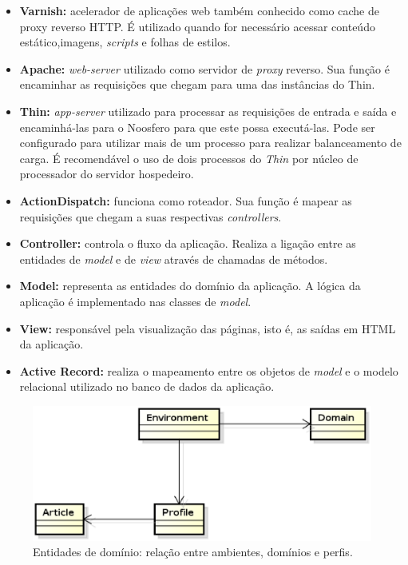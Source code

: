 \begin{itemize}
	\item \textbf{Varnish:} acelerador de aplicações web também conhecido 
	como cache de proxy reverso HTTP. É utilizado quando for necessário
	acessar conteúdo estático,imagens, \textit{scripts} e folhas de estilos.

	\item \textbf{Apache:} \textit{web-server} utilizado como servidor de 
	\textit{proxy} reverso. Sua função é encaminhar as requisições que
	chegam para uma das instâncias do Thin.

	\item \textbf{Thin:} \textit{app-server} utilizado para processar as
	requisições de entrada e saída e encaminhá-las para o Noosfero para que
	este possa executá-las. Pode ser configurado para utilizar mais de um
	processo para realizar balanceamento de carga. É recomendável o uso de
	dois processos do \textit{Thin} por núcleo de processador do servidor
	hospedeiro.
	
	\item \textbf{ActionDispatch:} funciona como roteador. Sua função é
	mapear as requisições que chegam a suas respectivas \textit{controllers}.
	
	\item \textbf{Controller:} controla o fluxo da aplicação. Realiza a
	ligação entre as entidades de \textit{model} e de \textit{view} através
	de chamadas de métodos.
	
	\item \textbf{Model:} representa as entidades do domínio da aplicação.
	A lógica da aplicação é implementado nas classes de \textit{model}.

	\item \textbf{View:} responsável pela visualização das páginas, isto é,
	as saídas em HTML da aplicação.
	
	\item \textbf{Active Record:} realiza o mapeamento entre os objetos de
	\textit{model} e o modelo relacional utilizado no banco de dados da
	aplicação.		
	
\end{itemize}


\begin{figure}[h!]
	\centering
	\includegraphics[keepaspectratio=true,scale=0.65]
	  {figuras/domain_main.eps}
	\caption{Entidades de domínio: relação entre ambientes, domínios e perfis.}
	\label{domain_main}
\end{figure}

